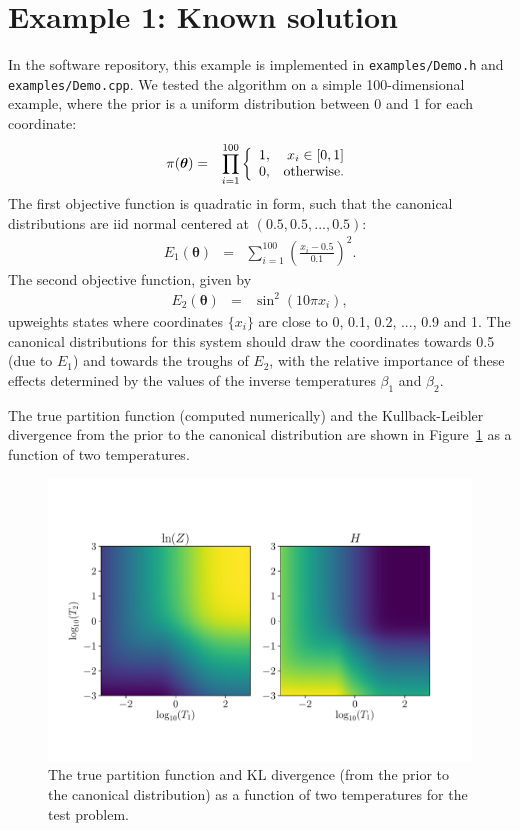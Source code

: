 \documentclass[entropy,article,submit,moreauthors,pdftex,10pt,a4paper]{Definitions/mdpi}
\newcommand{\xx}{\boldsymbol{\theta}}
\begin{document}
\section{Example 1: Known solution}
In the software repository, this example is implemented in
{\tt examples/Demo.h} and {\tt examples/Demo.cpp}.
We tested the algorithm on a simple 100-dimensional example, where the
prior is a uniform distribution between 0 and 1 for each coordinate:
\begin{eqnarray}
\pi(\xx) &=& \prod_{i=1}^{100}
\left\{
\begin{array}{lr}
1, & x_i \in [0, 1]\\
0, & \textnormal{otherwise.}
\end{array}
\right.
\end{eqnarray}
The first objective function is quadratic in form, such that the canonical
distributions are iid normal centered at $(0.5, 0.5, ..., 0.5)$:
\begin{eqnarray}
E_1(\xx) &=& \sum_{i=1}^{100} \left(\frac{x_i - 0.5}{0.1}\right)^2.
\end{eqnarray}
The second objective function, given by
\begin{eqnarray} 
E_2(\xx) &=& \sin^2(10 \pi x_i),
\end{eqnarray}
upweights states where coordinates $\{x_i\}$
are close to 0, 0.1, 0.2, ..., 0.9 and 1.
The canonical distributions for this system should draw the coordinates
towards 0.5 (due to $E_1$) and towards the troughs of $E_2$, with the
relative importance of these effects determined by the values of the
inverse temperatures $\beta_1$ and $\beta_2$.

The true partition function (computed numerically) and the Kullback-Leibler
divergence from the prior to the canonical distribution are shown in
Figure~\ref{fig:truth} as a function of two temperatures.

\begin{figure}[ht!]
\centering
\includegraphics[scale=0.75]{figures/demo_truth.pdf}
\caption{The true partition function and KL divergence (from the prior to
the canonical distribution) as a function of two temperatures for the
test problem.\label{fig:truth}}
\end{figure}
\end{document}
